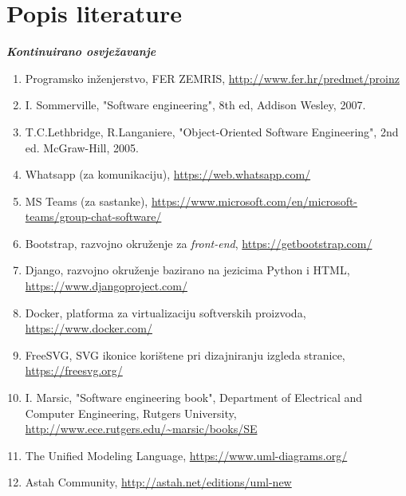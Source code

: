 \chapter*{Popis literature}
	 	
 		\textbf{\textit{Kontinuirano osvježavanje}}
	
		
		\begin{enumerate}
			
			
			\item  Programsko inženjerstvo, FER ZEMRIS, \url{http://www.fer.hr/predmet/proinz}
			
			\item  I. Sommerville, "Software engineering", 8th ed, Addison Wesley, 2007.
			
			\item  T.C.Lethbridge, R.Langaniere, "Object-Oriented Software Engineering", 2nd ed. McGraw-Hill, 2005.

			\item  Whatsapp (za komunikaciju), \url{https://web.whatsapp.com/}

			\item  MS Teams (za sastanke), \url{https://www.microsoft.com/en/microsoft-teams/group-chat-software/}

			\item  Bootstrap, razvojno okruženje za \textit{front-end}, \url{https://getbootstrap.com/}

			\item  Django, razvojno okruženje bazirano na jezicima Python i HTML, \url{https://www.djangoproject.com/}

			\item  Docker, platforma za virtualizaciju softverskih proizvoda, \url{https://www.docker.com/}

			\item  FreeSVG, SVG ikonice korištene pri dizajniranju izgleda stranice, \url{https://freesvg.org/}
			
			\item  I. Marsic, "Software engineering book", Department of Electrical and Computer Engineering, Rutgers University, \url{http://www.ece.rutgers.edu/~marsic/books/SE}
			
			\item  The Unified Modeling Language, \url{https://www.uml-diagrams.org/}
			
			\item  Astah Community, \url{http://astah.net/editions/uml-new}
		\end{enumerate}
		
		 